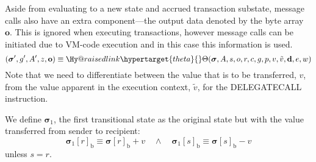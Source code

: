 \documentclass[9pt,oneside]{amsart}
\makeatletter
\newcommand{\linkdest}[1]{\Hy@raisedlink{\hypertarget{#1}{}}}
\makeatother
\begin{document}
\begin{multicols}{2}
Aside from evaluating to a new state and accrued transaction substate, message calls also have an extra component---the output data denoted by the byte array~$\mathbf{o}$. This is ignored when executing transactions, however message calls can be initiated due to VM-code execution and in this case this information is used.
\begin{equation}
(\boldsymbol{\sigma}', g', A', z, \mathbf{o}) \equiv \linkdest{theta}{\Theta}(\boldsymbol{\sigma}, A, s, o, r, c, g, p, v, \tilde{v}, \mathbf{d}, e, w)
\end{equation}
Note that we need to differentiate between the value that is to be transferred, $v$, from the value apparent in the execution context, $\tilde{v}$, for the {\small DELEGATECALL} instruction.

We define $\boldsymbol{\sigma}_1$, the first transitional state as the original state but with the value transferred from sender to recipient:
\begin{equation}
\boldsymbol{\sigma}_1[r]_{\mathrm{b}} \equiv \boldsymbol{\sigma}[r]_{\mathrm{b}} + v \quad\wedge\quad \boldsymbol{\sigma}_1[s]_{\mathrm{b}} \equiv \boldsymbol{\sigma}[s]_{\mathrm{b}} - v
\end{equation}
unless $s = r$.


\end{multicols}
\end{document}
